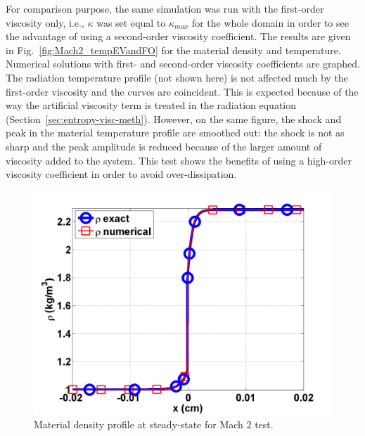 \documentclass[review]{elsarticle}
\newcommand{\fig}[1]{Fig.~\ref{#1}}                      %
\newcommand{\sect}[1]{Section~\ref{#1}}                     %
\begin{document}
For comparison purpose, the same simulation was run with the first-order viscosity only, i.e., $\kappa$ was set equal to $\kappa_{max}$ for the whole domain in order to see the advantage of using a second-order viscosity coefficient. The results are given in \fig{fig:Mach2_tempEVandFO} for the material density and temperature. Numerical solutions with first- and second-order viscosity coefficients are graphed. The radiation temperature profile (not shown here) is not affected much by the first-order viscosity and the curves are coincident. This is expected because of the way the artificial viscosity term is treated in the radiation equation (\sect{sec:entropy-visc-meth}). However, on the same figure, the shock and peak in the material temperature profile are smoothed out: the shock is not as sharp and the peak amplitude is reduced because of the larger amount of viscosity added to the system. This test shows the benefits of using a high-order viscosity coefficient in order to avoid over-dissipation.
\begin{figure}[H]
                \centering
                \includegraphics[width=\textwidth]{Mach_2_nel_2000_density.png}
        \caption{Material density profile at steady-state for Mach 2 test.}\label{fig:Mach2_density}
\end{figure}
\end{document}
